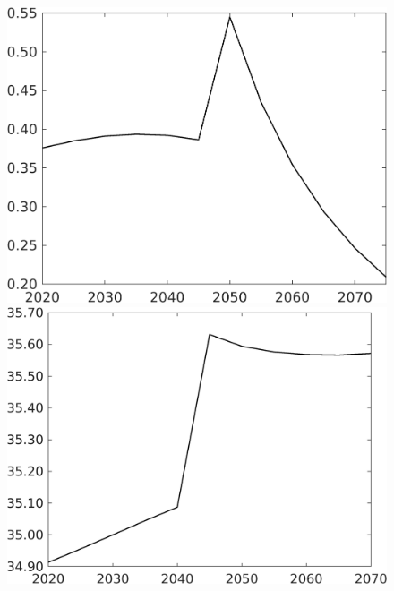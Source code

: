 \documentclass[12pt]{article}
\begin{document}
\begin{figure}[h!!]
\begin{minipage}[]{0.32\textwidth}
\end{minipage}
\begin{minipage}[]{0.32\textwidth}
	\includegraphics[width=1\textwidth]{../../codding_model/own_basedOnFried/optimalPol_010922_revision/figures/all_13Sept22/CompTaufPER_bytaul_Reg0_sn_spillover0_nsk0_xgr0_knspil0_sep0_LFlimit1_emsbase0_countec0_GovRev0_etaa0.79_lgd0.png}
\end{minipage}		
\begin{minipage}[]{0.32\textwidth}
\includegraphics[width=1\textwidth]{../../codding_model/own_basedOnFried/optimalPol_010922_revision/figures/all_13Sept22/CompTaufPER_bytaul_Reg0_gAf_spillover0_nsk0_xgr0_knspil0_sep0_LFlimit1_emsbase0_countec0_GovRev0_etaa0.79_lgd0.png}

\end{minipage}
\end{figure}
\end{document}
